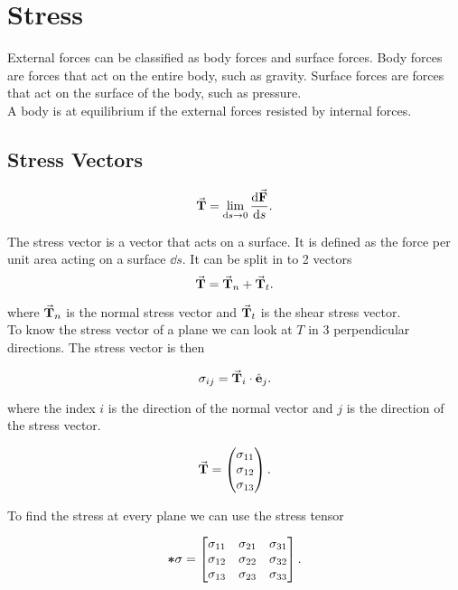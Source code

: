 \documentclass{report}
\begin{document}
\chapter{Stress}

External forces can be classified as body forces and surface forces. Body forces are forces that act on the entire body, such as gravity. Surface forces are forces that act on the surface of the body, such as pressure. \\

A body is at equilibrium if the external forces resisted by internal forces.

\section{Stress Vectors}

\[
	\va{T} = \lim_{\dd{s}\to 0} \dv{\va{F}}{s}
	.\]

The stress vector is a vector that acts on a surface. It is defined as the force per unit area acting on a surface $\dd{s}$. It can be split in to 2 vectors
\[
	\vec{\bm{\mathrm{T}}} = \vec{\bm{\mathrm{T}}}_n + \vec{\bm{\mathrm{T}}}_t
	.\]

where $\vec{\bm{\mathrm{T}}}_n$ is the normal stress vector and $\vec{\bm{\mathrm{T}}}_t$ is the shear stress vector. \\

To know the stress vector of a plane we can look at $T$ in 3 perpendicular directions. The stress vector is then

\[
	\sigma_{ij} = \vec{\bm{\mathrm{T}}}_i \cdot \hat{\bm{\mathrm{e}}}_j
	.\]

where the index $i$ is the direction of the normal vector and $j$ is the direction of the stress vector.

\[
	\vec{\bm{\mathrm{T}}} = \begin{pmatrix}
		\sigma_{11} \\
		\sigma_{12} \\
		\sigma_{13}
	\end{pmatrix}
	.\]

To find the stress at every plane we can use the stress tensor

\[
	\bm{\mathrm{*}}{\sigma} = \begin{bmatrix}
		\sigma_{11} & \sigma_{21} & \sigma_{31} \\
		\sigma_{12} & \sigma_{22} & \sigma_{32} \\
		\sigma_{13} & \sigma_{23} & \sigma_{33}
	\end{bmatrix}
	.\]

\end{document}
